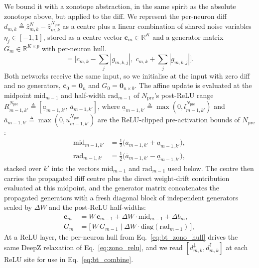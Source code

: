 \documentclass[11pt]{article}
\newcommand{\RR}{\mathbb{R}}
\begin{document}
We bound it with a zonotope abstraction,  in the same spirit as the absolute zonotope above, 
but applied to the diff. We represent the per-neuron diff 
$d_{m,k} \triangleq \hat z^{N}_{m,k} - \hat z^{N_\text{pre}}_{m,k}$ 
as a centre plus a linear combination of shared noise variables $\eta_j \in [-1, 1]$, 
stored as a centre vector $\mathbf c_m \in \RR^K$ and a generator matrix $G_m \in \RR^{K \times p}$ 
with per-neuron hull.
\begin{equation}
  [d^\downarrow_{m,k}, d^\uparrow_{m,k}] = \bigl[c_{m,k} - \textstyle\sum_j |g_{m,k,j}|,\; c_{m,k} + \textstyle\sum_j |g_{m,k,j}|\bigr].
  \label{eq:bt_zono_hull}
\end{equation}
Both networks receive the same input, so we initialise at the 
input with zero diff and no generators, $\mathbf c_0 = \mathbf 0_n$ and $G_0 = \mathbf 0_{n \times 0}$. 
The affine update is evaluated at the midpoint $\mathrm{mid}_{m-1}$ and half-width
$\mathrm{rad}_{m-1}$ of $N_\text{pre}$'s post-ReLU range
$R^{N_\text{pre}}_{m-1,k'} \triangleq [\underline a_{m-1,k'},\, \overline a_{m-1,k'}]$, where
$\underline a_{m-1,k'} \triangleq \max(0, l^{N_\text{pre}}_{m-1,k'})$ and
$\overline a_{m-1,k'} \triangleq \max(0, u^{N_\text{pre}}_{m-1,k'})$ are the ReLU-clipped
pre-activation bounds of $N_\text{pre}$:
\begin{align}
  \mathrm{mid}_{m-1,k'} &= \tfrac{1}{2}\bigl(\overline a_{m-1,k'} + \underline a_{m-1,k'}\bigr), \nonumber\\
  \mathrm{rad}_{m-1,k'} &= \tfrac{1}{2}\bigl(\overline a_{m-1,k'} - \underline a_{m-1,k'}\bigr),
  \label{eq:bt_midrad}
\end{align}
stacked over $k'$ into the vectors $\mathrm{mid}_{m-1}$ and $\mathrm{rad}_{m-1}$ used below.
The centre then carries the propagated diff centre plus the direct weight-drift
contribution evaluated at this midpoint, and the generator matrix
concatenates the propagated generators with a fresh diagonal block of independent generators
scaled by $\Delta W$ and the post-ReLU half-widths:
\begin{align}
  \mathbf c_m &= W\, \mathbf c_{m-1} + \Delta W \cdot \mathrm{mid}_{m-1} + \Delta b_m, \nonumber\\
  G_m &= \bigl[\,W\, G_{m-1} \;\big|\; \Delta W \cdot \mathrm{diag}(\mathrm{rad}_{m-1})\,\bigr],
  \label{eq:bt_zono_affine}
\end{align}
At a ReLU layer, the per-neuron hull from Eq.~\eqref{eq:bt_zono_hull} drives the same DeepZ relaxation 
of Eq.~\eqref{eq:zono_relu}, and we read $[d^\downarrow_{m,k}, d^\uparrow_{m,k}]$ at each ReLU site 
for use in Eq.~\eqref{eq:bt_combine}.
\end{document}
